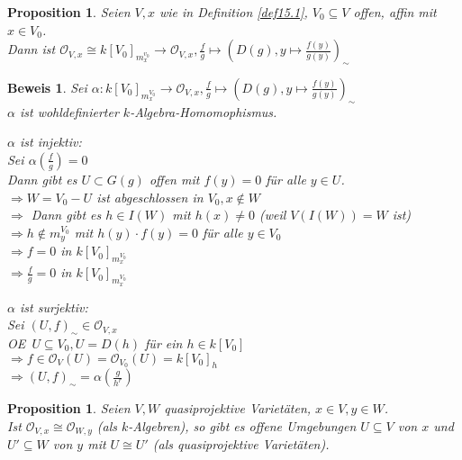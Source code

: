 \documentclass[a4paper,12pt]{report}
\theoremstyle{break}
\newtheorem{Prop}[Def]{Proposition}
\theoremstyle{nonumberbreak}
\newtheorem{Bew}{Beweis}
\theoremstyle{nonumberplain}
\newcommand{\calO}{\mathcal{O}}
\renewcommand{\OE}{O\!\!E~}
\begin{document}
\begin{Prop}\label{prop15.4}
Seien $V,x$ wie in Definition \ref{def15.1}, $V_0\subseteq V$ offen, affin mit $x\in V_0$.\\
Dann ist $\calO_{V,x}\cong k[V_0]_{m_x^{v_0}}\to\calO_{V,x}, \frac{f}{g}\mapsto(D(g), y\mapsto\frac{f(y)}{g(y)})_\sim$
\end{Prop}

\begin{Bew}
Sei $\alpha:k[V_0]_{m_x^{V_0}}\to \calO_{V,x}, \frac{f}{g}\mapsto(D(g),y\mapsto\frac{f(y)}{g(y)})_\sim$\\
$\alpha$ ist wohldefinierter $k$-Algebra-Homomophismus.
\begin{description}
\item\emph{$\alpha$ ist injektiv:}\\
	Sei $\alpha(\frac{f}{g})=0$\\
	Dann gibt es $U\subset G(g)$ offen mit $f(y)=0$ f\"ur alle $y\in U$.\\
	$\Rightarrow W=V_0-U$ ist abgeschlossen in $V_0, x\notin W$\\
	$\Rightarrow $ Dann gibt es $h\in I(W)$ mit $h(x)\ne0$ (weil $V(I(W))=W$ ist)\\
	$\Rightarrow h\notin m_y^{V_0}$ mit $h(y)\cdot f(y)=0$ f\"ur alle $y\in V_0$\\
	$\Rightarrow f=0$ in $k[V_0]_{m_x^{V_0}}$\\
	$\Rightarrow \frac{f}{g}=0$ in $k[V_0]_{m_x^{V_0}}$
\item\emph{$\alpha$ ist surjektiv:}\\
	Sei $(U,f)_\sim\in\calO_{V,x}$\\
	\OE $U\subseteq V_0, U=D(h)$ f\"ur ein $h\in k[V_0]$\\
	$\Rightarrow f\in\calO_V(U)=\calO_{V_0}(U)=k[V_0]_h$\\
	$\Rightarrow (U,f)_\sim=\alpha(\frac{g}{h^r})$
\end{description}\end{Bew}

\begin{Prop}\label{prop15.5}
Seien $V,W$ quasiprojektive Variet\"aten, $x\in V, y\in W$.\\
Ist $\calO_{V,x}\cong\calO_{W,y}$ (als $k$-Algebren), so gibt es offene Umgebungen $U\subseteq V$ von $x$ und $U'\subseteq W$ von $y$ mit $U\cong U'$ (als quasiprojektive Variet\"aten).
\end{Prop}
\end{document}
